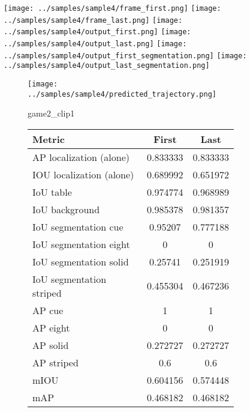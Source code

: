 \begin{figure}
    \texttt{[image: ../samples/sample4/frame\_first.png]}
    \texttt{[image: ../samples/sample4/frame\_last.png]}
    \newline
    \texttt{[image: ../samples/sample4/output\_first.png]}
    \texttt{[image: ../samples/sample4/output\_last.png]}
    \newline
    \texttt{[image: ../samples/sample4/output\_first\_segmentation.png]}
    \texttt{[image: ../samples/sample4/output\_last\_segmentation.png]}
    \newline
    \begin{subfigure}[b]{0.49\textwidth}
        \vspace{20pt}
        \texttt{[image: ../samples/sample4/predicted\_trajectory.png]}
        \caption*{game2\_clip1}
    \end{subfigure}
\begin{subfigure}[b]{0.49\textwidth}
    \begin{tabular}{|l|c|c|}
        \hline
        \textbf{Metric} & \textbf{First} & \textbf{Last} \\
        \hline
        AP localization (alone) & 0.833333 & 0.833333 \\ 
        IOU localization (alone) & 0.689992 & 0.651972 \\ 
        \hline
        IoU table & 0.974774 & 0.968989 \\ 
        IoU background & 0.985378 & 0.981357 \\ 
        \hline
        IoU segmentation cue & 0.95207 & 0.777188 \\ 
        IoU segmentation eight & 0 & 0 \\ 
        IoU segmentation solid & 0.25741 & 0.251919 \\ 
        IoU segmentation striped & 0.455304 & 0.467236 \\ 
        \hline
        AP cue & 1 & 1 \\ 
        AP eight & 0 & 0 \\ 
        AP solid & 0.272727 & 0.272727 \\ 
        AP striped & 0.6 & 0.6 \\ 
        \hline
        mIOU & 0.604156 & 0.574448 \\ 
        mAP & 0.468182 & 0.468182 \\ 
        \hline
    \end{tabular} 
\end{subfigure}
\end{figure}


